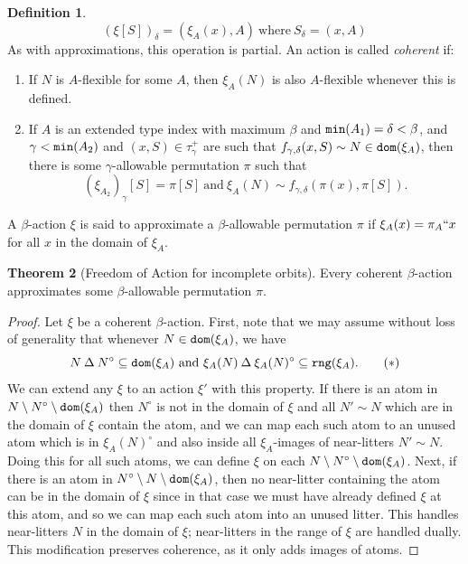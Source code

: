 \documentclass{article}
\theoremstyle{definition}
\newtheorem{theorem}{Theorem}[section]
\newtheorem{definition}[theorem]{Definition}
\theoremstyle{remark}
\begin{document}
{\begin{definition}
  $$ (\xi[S])_\delta = (\xi_A(x), A) \ \mathrm{where}\ S_\delta = (x, A) $$
  As with approximations, this operation is partial.
  An action is called \emph{coherent} if:
  \begin{enumerate}
    \item If $N$ is $A$-flexible for some $A$, then $\xi_A(N)$ is also $A$-flexible whenever this is defined.
    \item If $A$ is an extended type index with maximum $\beta$ and ${\tt min}(A_1) = \delta < \beta$, and $\gamma < {\tt min}(A_2)$ and $(x, S) \in \tau_\gamma^+$ are such that $f_{\gamma,\delta}(x, S) \sim N \in {\tt dom}(\xi_A)$, then there is some $\gamma$-allowable permutation $\pi$ such that
    $$ (\xi_{A_2})_\gamma[S] = \pi[S] \ \mathrm{and}\ \xi_A(N) \sim f_{\gamma,\delta}(\pi(x), \pi[S]). $$
  \end{enumerate}
  A $\beta$-action $\xi$ is said to approximate a $\beta$-allowable permutation $\pi$ if $\xi_A(x) = \pi_A``x$ for all $x$ in the domain of $\xi_A$.
\end{definition}
\begin{theorem}[Freedom of Action for incomplete orbits]\label{thm:foa_actions}
  Every coherent $\beta$-action approximates some $\beta$-allowable permutation $\pi$.
\end{theorem}
\begin{proof}
  Let $\xi$ be a coherent $\beta$-action.
  First, note that we may assume without loss of generality that whenever $N \in {\tt dom}(\xi_A)$, we have
  \begin{equation}
    N \mathbin\Delta N^\circ \subseteq {\tt dom}(\xi_A) \ \mathrm{and}\ \xi_A(N) \mathbin\Delta \xi_A(N)^\circ \subseteq {\tt rng}(\xi_A).
    \tag{$*$}
  \end{equation}
  We can extend any $\xi$ to an action $\xi'$ with this property.
  If there is an atom in $N \setminus N^\circ \setminus {\tt dom}(\xi_A)$ then $N^{\circ}$ is not in the domain of $\xi$ and all $N' \sim N$ which are in the domain of $\xi$ contain the atom, and we can map each such atom to an unused atom which is in $\xi_A(N)^\circ$ and also inside all $\xi_A$-images of near-litters $N' \sim N$.
  Doing this for all such atoms, we can define $\xi$ on each $N \setminus N^\circ \setminus {\tt dom}(\xi_A)$.
  Next, if there is an atom in $N^\circ \setminus N \setminus {\tt dom}(\xi_A)$, then no near-litter containing the atom can be in the domain of $\xi$ since in that case we must have already defined $\xi$ at this atom, and so we can map each such atom into an unused litter.
  This handles near-litters $N$ in the domain of $\xi$;  near-litters in the range of $\xi$ are handled dually.
  This modification preserves coherence, as it only adds images of atoms.


\end{proof}}
\end{document}
